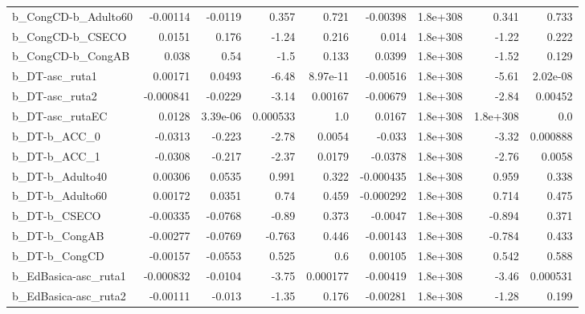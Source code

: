 \begin{tabular}{lrrrrrrrr}
b\_CongCD-b\_Adulto60          &    -0.00114 &      -0.0119 &     0.357 &    0.721 &   -0.00398 &    1.8e+308 &        0.341 &         0.733 \\
b\_CongCD-b\_CSECO             &      0.0151 &        0.176 &     -1.24 &    0.216 &      0.014 &    1.8e+308 &        -1.22 &         0.222 \\
b\_CongCD-b\_CongAB            &       0.038 &         0.54 &      -1.5 &    0.133 &     0.0399 &    1.8e+308 &        -1.52 &         0.129 \\
b\_DT-asc\_ruta1               &     0.00171 &       0.0493 &     -6.48 & 8.97e-11 &   -0.00516 &    1.8e+308 &        -5.61 &      2.02e-08 \\
b\_DT-asc\_ruta2               &   -0.000841 &      -0.0229 &     -3.14 &  0.00167 &   -0.00679 &    1.8e+308 &        -2.84 &       0.00452 \\
b\_DT-asc\_rutaEC              &      0.0128 &     3.39e-06 &  0.000533 &      1.0 &     0.0167 &    1.8e+308 &     1.8e+308 &           0.0 \\
b\_DT-b\_ACC\_0                 &     -0.0313 &       -0.223 &     -2.78 &   0.0054 &     -0.033 &    1.8e+308 &        -3.32 &      0.000888 \\
b\_DT-b\_ACC\_1                 &     -0.0308 &       -0.217 &     -2.37 &   0.0179 &    -0.0378 &    1.8e+308 &        -2.76 &        0.0058 \\
b\_DT-b\_Adulto40              &     0.00306 &       0.0535 &     0.991 &    0.322 &  -0.000435 &    1.8e+308 &        0.959 &         0.338 \\
b\_DT-b\_Adulto60              &     0.00172 &       0.0351 &      0.74 &    0.459 &  -0.000292 &    1.8e+308 &        0.714 &         0.475 \\
b\_DT-b\_CSECO                 &    -0.00335 &      -0.0768 &     -0.89 &    0.373 &    -0.0047 &    1.8e+308 &       -0.894 &         0.371 \\
b\_DT-b\_CongAB                &    -0.00277 &      -0.0769 &    -0.763 &    0.446 &   -0.00143 &    1.8e+308 &       -0.784 &         0.433 \\
b\_DT-b\_CongCD                &    -0.00157 &      -0.0553 &     0.525 &      0.6 &    0.00105 &    1.8e+308 &        0.542 &         0.588 \\
b\_EdBasica-asc\_ruta1         &   -0.000832 &      -0.0104 &     -3.75 & 0.000177 &   -0.00419 &    1.8e+308 &        -3.46 &      0.000531 \\
b\_EdBasica-asc\_ruta2         &    -0.00111 &       -0.013 &     -1.35 &    0.176 &   -0.00281 &    1.8e+308 &        -1.28 &         0.199 \\

\end{tabular}
